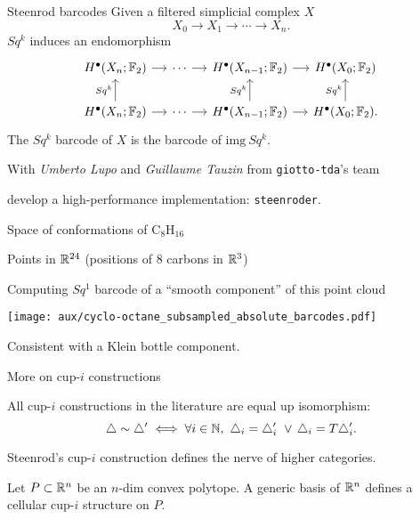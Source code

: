 \begin{frame}[fragile]{Steenrod barcodes} \pause
	Given a filtered simplicial complex $X$
	\[
	X_0 \to X_1 \to \cdots \to X_n.
	\]
	\pause
	$Sq^k$ induces an endomorphism
	\[
	\begin{tikzcd}[column sep = small]
	H^\bullet(X_n; \Ftwo) \arrow[r] & \cdots \arrow[r] & H^\bullet(X_{n-1}; \Ftwo) \arrow[r] & H^\bullet(X_0; \Ftwo) \\
	H^\bullet(X_n; \Ftwo) \arrow[u, "Sq^k"] \arrow[r] & \cdots \arrow[r] & H^\bullet(X_{n-1}; \Ftwo) \arrow[u, "Sq^k"] \arrow[r] & H^\bullet(X_0; \Ftwo) \arrow[u, "Sq^k"].
	\end{tikzcd}
	\]
	The \textcolor{pblue}{$Sq^k$ barcode} of $X$ is the barcode of $\mathrm{img}\ Sq^k$.

	\bigskip\pause

	With \textit{Umberto Lupo} and \textit{Guillaume Tauzin} from \textcolor{pblue}{\texttt{giotto-tda}}'s team

	\medskip
	develop a high-performance implementation: \textcolor{pblue}{\texttt{steenroder}}.
\end{frame}

\begin{frame}{Space of conformations of $\mathrm{C_8H_{16}}$}

	Points in $\mathbb{R}^{24}$ (positions of $8$ carbons in $\mathbb{R}^3$)

	\pause\smallskip

	Computing $Sq^1$ barcode of a ``smooth component'' of this point cloud

	\smallskip

	\texttt{[image: aux/cyclo-octane\_subsampled\_absolute\_barcodes.pdf]}

	Consistent with a \textcolor{pblue}{Klein bottle} component.
\end{frame}

\begin{frame}{More on cup-$i$ constructions}

	\pause

	\begin{theorem}[Med.]
		All cup-$i$ constructions in the literature are equal up isomorphism:
		\[
		\triangle \sim \triangle^\prime \iff \forall i \in \mathbb{N}, \ \triangle_i = \triangle_i^\prime \ \vee \, \triangle_i = T \triangle_i^\prime.
		\]
	\end{theorem}

	\medskip\pause

	\begin{theorem}[Med.]
		Steenrod's cup-$i$ construction defines the nerve of higher categories.
	\end{theorem}

	\medskip\pause

	\begin{theorem}
		Let $P \subset \mathbb{R}^n$ be an $n$-dim convex polytope.
		A generic basis of $\mathbb{R}^n$ defines a cellular cup-$i$ structure on $P$.
	\end{theorem}
\end{frame}


